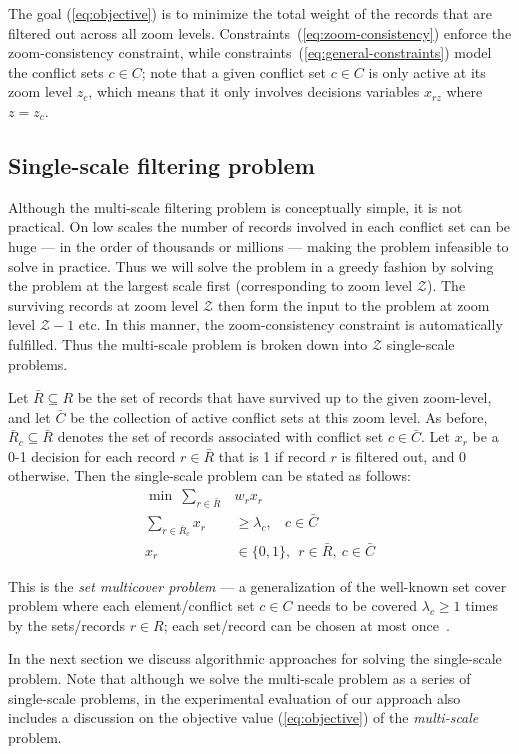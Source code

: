 The goal (\ref{eq:objective}) is to minimize the total weight of the records that are filtered out across all zoom levels. Constraints~(\ref{eq:zoom-consistency}) enforce the zoom-consistency constraint, while constraints~(\ref{eq:general-constraints}) model the conflict sets $c \in C$; note that a given conflict set $c \in C$ is only active at its zoom level $z_c$, which means that it only involves decisions variables $x_{rz}$ where $z = z_c$.

\subsection{Single-scale filtering problem}

Although the multi-scale filtering problem is conceptually simple, it is not practical. On low scales the number of records involved in each conflict set can be huge --- in the order of thousands or millions --- making the problem infeasible to solve in practice. Thus we will solve the problem in a greedy fashion by solving the problem at the largest scale first (corresponding to zoom level $\mathcal{Z}$). The surviving records at zoom level $\mathcal{Z}$ then form the input to the problem at zoom level $\mathcal{Z}-1$ etc. In this manner, the zoom-consistency constraint is automatically fulfilled. Thus the multi-scale problem is broken down into $\mathcal{Z}$ single-scale problems.

Let $\bar{R} \subseteq R$ be the set of records that have survived up to the given zoom-level, and let $\bar{C}$ be the collection of active conflict sets at this zoom level. As before, $\bar{R}_c \subseteq \bar{R}$ denotes the set of records associated with conflict set $c \in \bar{C}$. Let $x_r$ be a 0-1 decision for each record $r \in \bar{R}$ that is 1 if record $r$ is filtered out, and 0 otherwise. Then the single-scale problem can be stated as follows:
\begin{align}
  \label{eq:objective-single}
  \min ~\sum_{r \in \bar{R}} &w_r x_r \\
  \label{eq:general-constraints-single}
  \sum_{r \in \bar{R}_c} x_r &\geq \lambda_c, ~~~~ c \in \bar{C} \\
  x_r & \in \{0, 1\}, ~~ r \in \bar{R}, ~c \in \bar{C}
\end{align}

This is the \emph{set multicover problem} --- a generalization of the well-known set cover problem where each element/conflict set $c \in C$ needs to be covered $\lambda_c \geq 1$ times by the sets/records $r \in R$; each set/record can be chosen at most once~\cite{RajogopalanVazirani98}. 

In the next section we discuss algorithmic approaches for solving the single-scale problem. Note that although we solve the multi-scale problem as a series of single-scale problems, in the experimental evaluation of our approach also includes a discussion on the objective value (\ref{eq:objective}) of the \emph{multi-scale} problem. 
